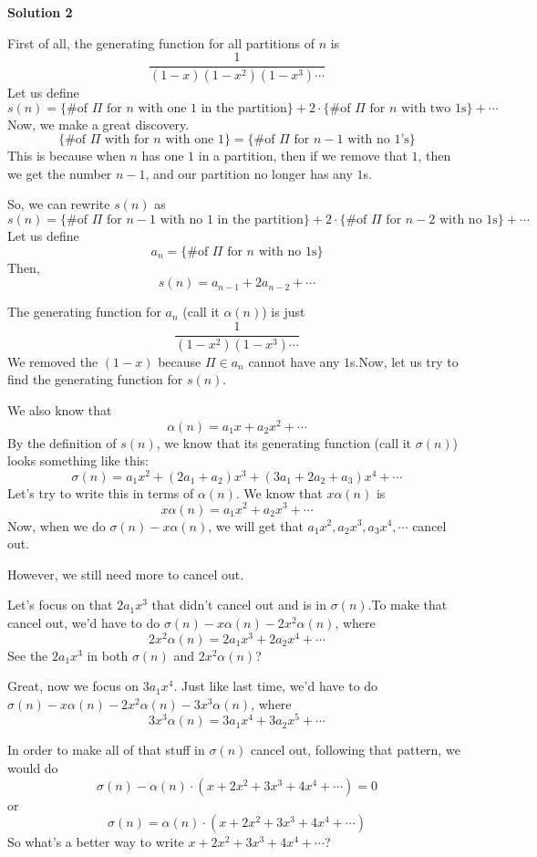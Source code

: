 \begin{enumerate}
 



\textbf{Solution 2}

First of all, the generating function for all partitions of $n$ is 
 \[\frac{1}{(1-x)(1-x^2)(1-x^3)\cdots}\]Let us define 
 \[s(n) = \{\text{\# of }\Pi\text{ for }n\text{ with one 1 in the partition}\} + 2\cdot\{\text{\# of }\Pi\text{ for }n\text{ with two 1s}\} + \cdots\]Now, we make a great discovery. 
 \[\{\text{\# of }\Pi\text{ with for }n\text{ with one 1}\} = \{\text{\# of }\Pi\text{ for }n-1\text{ with no 1's}\}\]This is because when $n$ has one $1$ in a partition, then if we remove that $1$, then we get the number $n-1$, and our partition no longer has any $1$s.

 So, we can rewrite $s(n)$ as 
 \[s(n) = \{\text{\# of }\Pi\text{ for }n-1\text{ with no 1 in the partition}\} + 2\cdot\{\text{\# of }\Pi\text{ for }n-2\text{ with no 1s}\} + \cdots\]Let us define 
 \[a_n = \{\text{\# of }\Pi\text{ for }n\text{ with no 1s}\}\]Then, 
 \[s(n) = a_{n-1} + 2a_{n-2} + \cdots\]

 The generating function for $a_n$ (call it $\alpha(n)$) is just 
 \[\frac{1}{(1-x^2)(1-x^3)\cdots}\]We removed the $(1-x)$ because $\Pi \in a_n$ cannot have any $1$s.Now, let us try to find the generating function for $s(n)$.

 We also know that 
 \[\alpha(n) = a_1x + a_2x^2 + \cdots\]By the definition of $s(n)$, we know that its generating function (call it $\sigma(n)$) looks something like this:
 \[\sigma(n) = a_1x^2+(2a_1+a_2)x^3+(3a_1+2a_2+a_3)x^4 + \cdots\]Let's try to write this in terms of $\alpha(n)$. We know that $x\alpha(n)$ is 
 \[x\alpha(n) = a_1x^2+a_2x^3 + \cdots\]Now, when we do $\sigma(n) -x \alpha(n)$, we will get that $a_1x^2, a_2x^3, a_3x^4, \cdots$ cancel out.

 However, we still need more to cancel out.

 Let's focus on that $2a_1x^3$ that didn't cancel out and is in $\sigma(n)$.To make that cancel out, we'd have to do $\sigma(n) - x\alpha(n) - 2x^2\alpha(n)$, where 
 \[2x^2\alpha(n) = 2a_1x^3+2a_2x^4 + \cdots\]See the $2a_1x^3$ in both $\sigma(n)$ and $2x^2\alpha(n)$?

 Great, now we focus on $3a_1x^4$. Just like last time, we'd have to do $\sigma(n) - x\alpha(n) - 2x^2\alpha(n) - 3x^3\alpha(n)$, where 
 \[3x^3\alpha(n) = 3a_1x^4+3a_2x^5 + \cdots\]

 In order to make all of that stuff in $\sigma(n)$ cancel out, following that pattern, we would do 
 \[\sigma(n) - \alpha(n)\cdot(x+2x^2+3x^3+4x^4 + \cdots) = 0\]or 
 \[\sigma(n) = \alpha(n) \cdot (x+2x^2+3x^3+4x^4 + \cdots)\]So what's a better way to write $x+2x^2+3x^3+4x^4+\cdots$? 


\end{enumerate}
